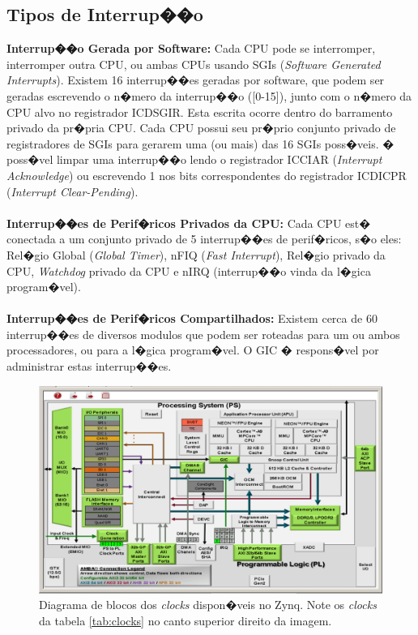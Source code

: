 \documentclass{ufscThesis/ufscThesis} %
\begin{document}
\subsection{Tipos de Interrup��o} %
\label{sec:interrupt}
\textbf{Interrup��o Gerada por Software: }
Cada CPU pode se interromper, interromper outra CPU, ou ambas CPUs usando SGIs (\emph{Software Generated Interrupts}). Existem 16 interrup��es geradas por software, que podem ser geradas escrevendo o n�mero da interrup��o ([0-15]), junto com o n�mero da CPU alvo no registrador ICDSGIR. Esta escrita ocorre dentro do barramento privado da pr�pria CPU. Cada CPU possui seu pr�prio conjunto privado de registradores de SGIs para gerarem uma (ou mais) das 16 SGIs poss�veis. � poss�vel limpar uma interrup��o lendo o registrador ICCIAR (\emph{Interrupt Acknowledge}) ou escrevendo 1 nos bits correspondentes do registrador ICDICPR (\emph{Interrupt Clear-Pending}).
\\\\
\textbf{Interrup��es de Perif�ricos Privados da CPU: }
Cada CPU est� conectada a um conjunto privado de 5 interrup��es de perif�ricos, s�o eles: Rel�gio Global (\emph{Global Timer}), nFIQ (\emph{Fast Interrupt}), Rel�gio privado da CPU, \emph{Watchdog} privado da CPU e nIRQ (interrup��o vinda da l�gica program�vel).
\\\\
\textbf{Interrup��es de Perif�ricos Compartilhados: }
Existem cerca de 60 interrup��es de diversos modulos que podem ser roteadas para um ou ambos processadores, ou para a l�gica program�vel. O GIC � respons�vel por administrar estas interrup��es.

\begin{figure}[ht!]
	\centerline{
    \includegraphics[width=13cm]{figuras/zynq-7000}
	}
    \caption{Diagrama de blocos dos \emph{clocks} dispon�veis no Zynq. Note os \emph{clocks} da tabela \ref{tab:clocks} no canto superior direito da imagem.}
\end{figure}
\end{document}
